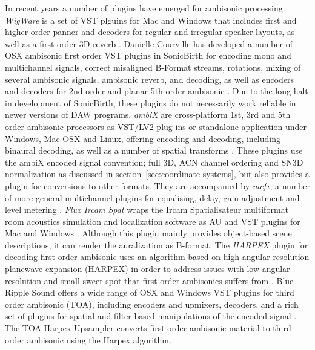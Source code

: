 \documentclass{article}
\begin{document}
In recent years a number of plugins have emerged for ambisonic processing.
\emph{WigWare} is a set of VST plguins for Mac and Windows that includes first and higher order panner and decoders for regular and irregular speaker layouts, as well as a first order 3D reverb \cite{Wiggins:2010wigware}.
Danielle Courville has developed a number of OSX ambisonic first order VST plugins in SonicBirth for encoding mono and multichannel signals, correct misaligned B-Format streams, rotations, mixing of several ambisonic signals, ambisonic reverb, and decoding, as well as encoders and decoders for 2nd order and planar 5th order ambisonic \cite{courville:2012b2x}.
Due to the long halt in development of SonicBirth, these plugins do not necessarily work reliable in newer versions of DAW programs.
\emph{ambiX} are cross-platform 1st, 3rd and 5th order ambisonic processors as VST/LV2 plug-ins or standalone application under Windows, Mac OSX and Linux, offering encoding and decoding, including binaural decoding, as well as a number of spatial transforms \cite{Kronlachner2013:ambix,Kronlachner:2014ambi-transforms}.
These plugins use the ambiX encoded signal convention; full 3D, ACN channel ordering and SN3D normalization \cite{Nachbar:2011ambix} as discussed in section~\ref{sec:coordinate-systems}, but also provides a plugin for conversions to other formats.
They are accompanied by \emph{mcfx}, a number of more general multichannel plugins for equalising, delay, gain adjustment and level metering \cite{kronlachner2014:mcfx}.
\emph{Flux Ircam Spat} wraps the Ircam Spatialisateur multiformat room acoustics simulation and localization software as AU and VST plugins for Mac and Windows \cite{flux:2010spat}.
Although this plugin mainly provides object-based scene descriptions, it can render the auralization as B-format.
The \emph{HARPEX} plugin for decoding first order ambisonic uses an algorithm based on high angular resolution planewave expansion (HARPEX) in order to address issues with low angular resolution and small sweet spot that first-order ambisonics suffers from \cite{Berge:2010harpex}.
Blue Ripple Sound offers a wide range of OSX and Windows VST plugins for third order ambisonic (TOA), including encoders and upmixers, decoders, and a rich set of plugins for spatial and filter-based manipulations of the encoded signal \cite{blueripple:2014TOA}.
The TOA Harpex Upsampler converts first order ambisonic material to third order ambisonic using the Harpex algorithm.
\end{document}

